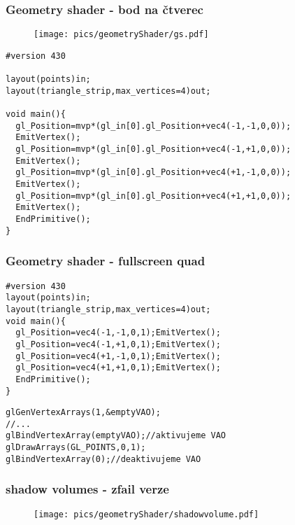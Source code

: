 \begin{frame}[fragile]
\frametitle{Geometry shader - bod na čtverec}
	\begin{figure}[h]
		\texttt{[image: pics/geometryShader/gs.pdf]}
	\end{figure}

	{\scriptsize
	\begin{verbatim}
#version 430

layout(points)in;
layout(triangle_strip,max_vertices=4)out;

void main(){
  gl_Position=mvp*(gl_in[0].gl_Position+vec4(-1,-1,0,0));
  EmitVertex();
  gl_Position=mvp*(gl_in[0].gl_Position+vec4(-1,+1,0,0));
  EmitVertex();
  gl_Position=mvp*(gl_in[0].gl_Position+vec4(+1,-1,0,0));
  EmitVertex();
  gl_Position=mvp*(gl_in[0].gl_Position+vec4(+1,+1,0,0));
  EmitVertex();
  EndPrimitive();
}
	\end{verbatim}
	}
\end{frame}

\begin{frame}[fragile]
\frametitle{Geometry shader - fullscreen quad}
	{\scriptsize
	\begin{verbatim}
#version 430
layout(points)in;
layout(triangle_strip,max_vertices=4)out;
void main(){
  gl_Position=vec4(-1,-1,0,1);EmitVertex();
  gl_Position=vec4(-1,+1,0,1);EmitVertex();
  gl_Position=vec4(+1,-1,0,1);EmitVertex();
  gl_Position=vec4(+1,+1,0,1);EmitVertex();
  EndPrimitive();
}
	\end{verbatim}
	}
	{\scriptsize
	\begin{verbatim}
glGenVertexArrays(1,&emptyVAO);
//...
glBindVertexArray(emptyVAO);//aktivujeme VAO
glDrawArrays(GL_POINTS,0,1);
glBindVertexArray(0);//deaktivujeme VAO
	\end{verbatim}
	}
\end{frame}

\begin{frame}[fragile]
\frametitle{shadow volumes - zfail verze}
  \begin{figure}[h]
    \texttt{[image: pics/geometryShader/shadowvolume.pdf]}
  \end{figure}
\end{frame}

